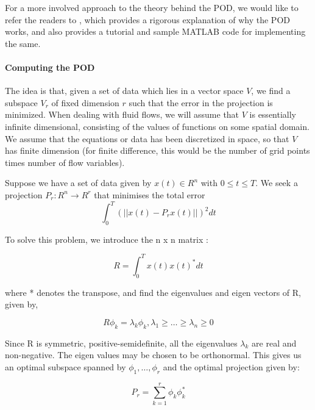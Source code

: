 \documentclass[submit]{aiaa-tc_mod}%
\begin{document}
For a more involved approach to the theory behind the POD, we would like to refer the readers to \cite{iiscintro}, which provides a rigorous explanation of why the POD works, and also provides a tutorial and sample MATLAB code for implementing the same. 

\paragraph{Computing the POD}
The idea is that, given a set of data which lies in a vector space $V$, we find a subspace $V_r$
of fixed dimension $r$ such that the error in the projection is minimized. When dealing with fluid flows,
we will assume that $V$ is essentially infinite dimensional, consisting of the values of functions on
some spatial domain. We assume that the equations or data has been discretized in space, so that $V$ has
finite dimension (for finite difference, this would be the number of grid points times number of flow variables).

Suppose we have a set of data given by $x(t) \in R^n$ with $0 \leq t \leq T $. We seek a projection
$P_r : R^n \rightarrow R^r$ that minimises the total error \\

\begin{equation}
\int_0^T (||x(t) - P_r x(t)||)^2dt 
\label{pod:1}
\end{equation}

To solve this problem, we introduce the n x n matrix : 

\begin{equation}
R = \int_0^Tx(t)x(t)^*dt
\label{pod:2}
\end{equation}

where * denotes the transpose, and find the eigenvalues and eigen vectors of R, given by,

\begin{equation}
R\phi_k = \lambda_k \phi_k, \lambda_1 \geq \dots \geq \lambda_n \geq 0
\label{pod:3}
\end{equation}

Since R is symmetric, positive-semidefinite, all the eigenvalues $\lambda_k$ are real and 
non-negative. The eigen values may be chosen to be orthonormal. This gives us an optimal 
subspace spanned by ${\phi_1, \dots, \phi_r}$ and the optimal projection given by:

\begin{equation}
P_r = \sum_{k=1}^r \phi_k \phi^*_k
\label{pod:4}
\end{equation}
\end{document}
